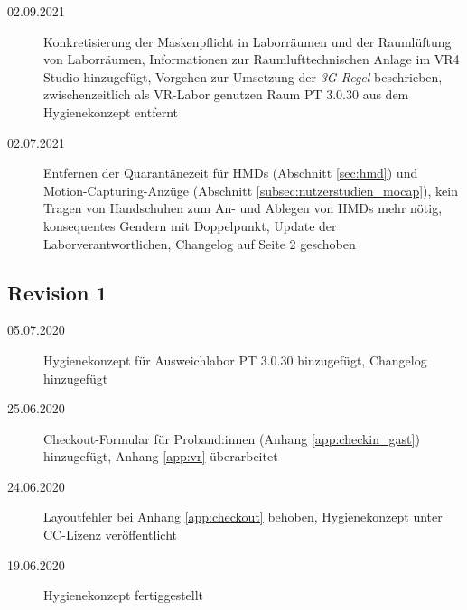 \documentclass[hidelinks,12pt]{extarticle}
\begin{document}
\begin{description}
    \item[02.09.2021] Konkretisierung der Maskenpflicht in Laborräumen und der Raumlüftung von Laborräumen, Informationen zur Raumlufttechnischen Anlage im VR4 Studio hinzugefügt, Vorgehen zur Umsetzung der \emph{3G-Regel} beschrieben, zwischenzeitlich als VR-Labor genutzen Raum PT 3.0.30 aus dem Hygienekonzept entfernt
    \item[02.07.2021] Entfernen der Quarantänezeit für HMDs (Abschnitt \ref{sec:hmd}) und Motion-Capturing-Anzüge (Abschnitt \ref{subsec:nutzerstudien_mocap}), kein Tragen von Handschuhen zum An- und Ablegen von HMDs mehr nötig, konsequentes Gendern mit Doppelpunkt, Update der Laborverantwortlichen, Changelog auf Seite 2 geschoben
\end{description}

\subsection*{Revision 1}

\begin{description}
    \item[05.07.2020] Hygienekonzept für Ausweichlabor PT 3.0.30 hinzugefügt, Changelog hinzugefügt
    \item[25.06.2020] Checkout-Formular für Proband:innen (Anhang \ref{app:checkin_gast}) hinzugefügt, Anhang \ref{app:vr} überarbeitet
    \item[24.06.2020] Layoutfehler bei Anhang \ref{app:checkout} behoben, Hygienekonzept unter CC-Lizenz veröffentlicht
    \item[19.06.2020] Hygienekonzept fertiggestellt


\end{description}

\newpage
\tableofcontents 














\end{document}
